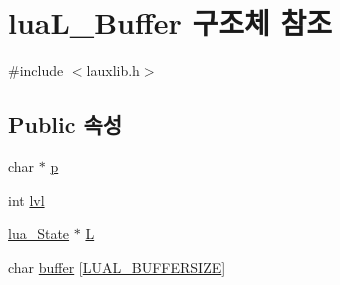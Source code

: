 \hypertarget{structlua_l___buffer}{\section{lua\-L\-\_\-\-Buffer 구조체 참조}
\label{structlua_l___buffer}
}


{\ttfamily \#include $<$lauxlib.\-h$>$}

\subsection*{\-Public 속성}
\begin{DoxyCompactItemize}
\item 
char $\ast$ \hyperlink{structlua_l___buffer_a0af2235170aa873ae30b2dab5a92d78f}{p}
\item 
int \hyperlink{structlua_l___buffer_a5edc23a360999279c335bac6f33121db}{lvl}
\item 
\hyperlink{lua_8h_a28186297f2e9f2de0652504633de8fb3}{lua\-\_\-\-State} $\ast$ \hyperlink{structlua_l___buffer_a66ae63716768952c74910da4351886fb}{\-L}
\item 
char \hyperlink{structlua_l___buffer_a848307dbf02455a3acfe690a6b3f9a71}{buffer} \mbox{[}\hyperlink{luaconf_8h_af360ad37a770dfdc29291a99c398f42d}{\-L\-U\-A\-L\-\_\-\-B\-U\-F\-F\-E\-R\-S\-I\-Z\-E}\mbox{]}
\end{DoxyCompactItemize}


